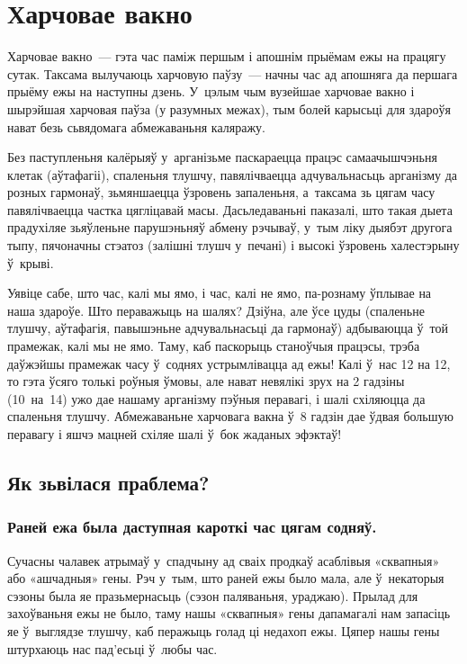 \chapter{Харчовае вакно}

Харчовае вакно~--- гэта час паміж першым і апошнім прыёмам ежы на працягу сутак. Таксама вылучаюць харчовую паўзу~--- начны час ад апошняга да першага прыёму ежы на наступны дзень. У~цэлым чым вузейшае харчовае вакно і шырэйшая харчовая паўза (у разумных межах), тым болей карысьці для здароўя нават безь сьвядомага абмежаваньня каляражу. 

Без паступленьня калёрыяў у~арганізьме паскараецца працэс самаачышчэньня клетак (аўтафагіі), спаленьня тлушчу, павялічваецца адчувальнасьць арганізму да розных гармонаў, зьмяншаецца ўзровень запаленьня, а~таксама зь цягам часу павялічваецца частка цягліцавай масы. Дасьледаваньні паказалі, што такая дыета прадухіляе зьяўленьне парушэньняў абмену рэчываў, у~тым ліку дыябэт другога тыпу, пячоначны стэатоз (залішні тлушч у~печані) і высокі ўзровень халестэрыну ў~крыві.


Уявіце сабе, што час, калі мы ямо, і час, калі не ямо, па-рознаму ўплывае на наша здароўе. Што пераважыць на шалях? Дзіўна, але ўсе цуды (спаленьне тлушчу, аўтафагія, павышэньне адчувальнасьці да гармонаў) адбываюцца ў~той прамежак, калі мы не ямо. Таму, каб паскорыць станоўчыя працэсы, трэба даўжэйшы прамежак часу ў~соднях устрымлівацца ад ежы! Калі ў~нас 12 на 12, то гэта ўсяго толькі роўныя ўмовы, але нават невялікі зрух на 2 гадзіны (10~на~14) ужо дае нашаму арганізму пэўныя перавагі, і шалі схіляюцца да спаленьня тлушчу. Абмежаваньне харчовага вакна ў~8 гадзін дае ўдвая большую перавагу і яшчэ мацней схіляе шалі ў~бок жаданых эфэктаў!

\section{Як зьвілася праблема?}

\subsection{Раней ежа была даступная кароткі час цягам содняў.}

Сучасны чалавек атрымаў у~спадчыну ад сваіх продкаў асаблівыя «сквапныя» або «ашчадныя» гены. Рэч у~тым, што раней ежы было мала, але ў~некаторыя сэзоны была яе празьмернасьць (сэзон паляваньня, ураджаю). Прылад для захоўваньня ежы не было, таму нашы «сквапныя» гены дапамагалі нам запасіць яе ў~выглядзе тлушчу, каб перажыць голад ці недахоп ежы. Цяпер нашы гены штурхаюць нас пад'есьці ў~любы час.

